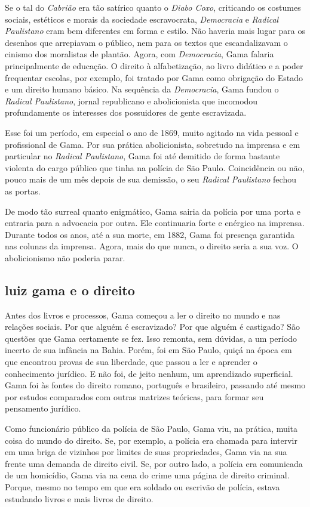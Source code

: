 Se o tal do \emph{Cabrião} era tão satírico quanto o \emph{Diabo Coxo},
criticando os costumes sociais, estéticos e morais da sociedade
escravocrata, \emph{Democracia} e \emph{Radical Paulistano} eram bem
diferentes em forma e estilo. Não haveria mais lugar para os desenhos
que arrepiavam o público, nem para os textos que escandalizavam o
cinismo dos moralistas de plantão. Agora, com \emph{Democracia}, Gama
falaria principalmente de educação. O direito à alfabetização, ao livro
didático e a poder frequentar escolas, por exemplo, foi tratado por Gama
como obrigação do Estado e um direito humano básico. Na sequência da
\emph{Democracia}, Gama fundou o \emph{Radical Paulistano}, jornal
republicano e abolicionista que incomodou profundamente os interesses
dos possuidores de gente escravizada.

Esse foi um período, em especial o ano de 1869, muito agitado na vida
pessoal e profissional de Gama. Por sua prática abolicionista, sobretudo
na imprensa e em particular no \emph{Radical Paulistano}, Gama foi até
demitido de forma bastante violenta do cargo público que tinha na
polícia de São Paulo. Coincidência ou não, pouco mais de um mês depois
de sua demissão, o seu \emph{Radical Paulistano} fechou as portas.

De modo tão surreal quanto enigmático, Gama sairia da polícia por uma
porta e entraria para a advocacia por outra. Ele continuaria forte e
enérgico na imprensa. Durante todos os anos, até a sua morte, em 1882,
Gama foi presença garantida nas colunas da imprensa. Agora, mais do que
nunca, o direito seria a sua voz. O abolicionismo não poderia parar.

\subsection{luiz gama e o direito}

Antes dos livros e processos, Gama começou a ler o direito no mundo e
nas relações sociais. Por que alguém é escravizado? Por que alguém é
castigado? São questões que Gama certamente se fez. Isso remonta, sem
dúvidas, a um período incerto de sua infância na Bahia. Porém, foi em
São Paulo, quiçá na época em que encontrou provas de sua liberdade, que
passou a ler e aprender o conhecimento jurídico. E não foi, de jeito
nenhum, um aprendizado superficial. Gama foi às fontes do direito
romano, português e brasileiro, passando até mesmo por estudos
comparados com outras matrizes teóricas, para formar seu pensamento
jurídico.

Como funcionário público da polícia de São Paulo, Gama viu, na prática,
muita coisa do mundo do direito. Se, por exemplo, a polícia era chamada
para intervir em uma briga de vizinhos por limites de suas propriedades,
Gama via na sua frente uma demanda de direito civil. Se, por outro lado,
a polícia era comunicada de um homicídio, Gama via na cena do crime uma
página de direito criminal. Porque, mesmo no tempo em que era soldado ou
escrivão de polícia, estava estudando livros e mais livros de direito.

